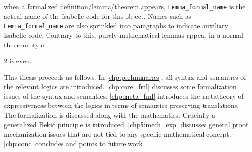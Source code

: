 when a formalized definition/lemma/theorem appears, \texttt{Lemma\_formal\_name} is the actual name of the Isabelle code for this object. Names such as \texttt{Lemma\_formal\_name} are also sprinkled into paragraphs to indicate auxiliary Isabelle code. Contrary to this, purely mathematical lemmas appear in a normal theorem style:

\begin{lemma}
    2 is even.
\end{lemma}

This thesis proceeds as follows. In \autoref{chp:preliminaries}, all syntax and semantics of the relevant logics are introduced. \autoref{chp:core_fml} discusses some formalization issues of the syntax and semantics. \autoref{chp:meta_fml} introduces the metatheory of expressiveness between the logics in terms of semantics preserving translations. The formalization is discussed along with the mathematics. Crucially a generalized Beki\v{c} principle is introduced. \autoref{chp5:mech_exp} discusses general proof mechanization issues that are not tied to any specific mathematical concept. \autoref{chp:conc} concludes and points to future work.